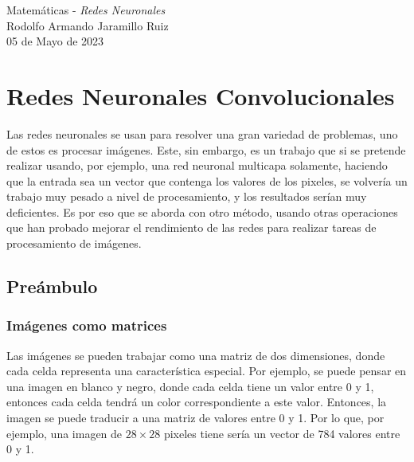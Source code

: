 \documentclass[14pt,a4paper]{report}
\begin{document}
\newcommand{\commentedbox}[2]{%
  \mbox{
    \begin{tabular}[t]{@{}c@{}}
    $\boxed{\displaystyle#1}$\\
    #2
    \end{tabular}%
  }%
}
\pagestyle{fancy}
\Large{Matemáticas - \textit{Redes Neuronales}}\\
\normalsize
Rodolfo Armando Jaramillo Ruiz\\
05 de Mayo de 2023\\
\section*{Redes Neuronales Convolucionales}

Las redes neuronales se usan para resolver una gran variedad de problemas, uno de estos es procesar imágenes. Este, sin embargo, es un trabajo que si se pretende realizar usando, por ejemplo, una red neuronal multicapa solamente, haciendo que la entrada sea un vector que contenga los valores de los pixeles, se volvería un trabajo muy pesado a nivel de procesamiento, y los resultados serían muy deficientes. Es por eso que se aborda con otro método, usando otras operaciones que han probado mejorar el rendimiento de las redes para realizar tareas de procesamiento de imágenes.

\subsection*{Preámbulo}

\subsubsection*{Imágenes como matrices}

Las imágenes se pueden trabajar como una matriz de dos dimensiones, donde cada celda representa una característica especial. Por ejemplo, se puede pensar en una imagen en blanco y negro, donde cada celda tiene un valor entre 0 y 1, entonces cada celda tendrá un color correspondiente a este valor. Entonces, la imagen se puede traducir a una matriz de valores entre 0 y 1. Por lo que, por ejemplo, una imagen de $28\times28$ pixeles tiene sería un vector de 784 valores entre 0 y 1.
\end{document}
